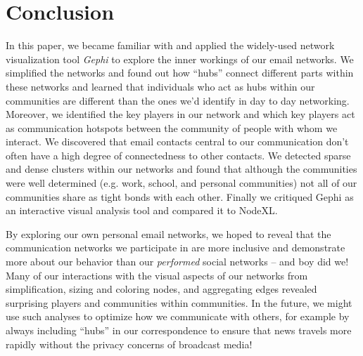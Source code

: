 \documentclass[11pt,letterpaper]{article}
\begin{document}
\section*{Conclusion}

In this paper, we became familiar with and applied the widely-used network visualization tool \textit{Gephi} to explore the inner workings of our email networks. We simplified the networks and found out how ``hubs'' connect different parts within these networks and learned that individuals who act as hubs within our communities are different than the ones we'd identify in day to day networking. Moreover, we identified the key players in our network and which key players act as communication hotspots between the community of people with whom we interact.  We discovered that email contacts central to our communication don't often have a high degree of connectedness to other contacts. We detected sparse and dense clusters within our networks and found that although the communities were well determined (e.g. work, school, and personal communities) not all of our communities share as tight bonds with each other. Finally we critiqued Gephi as an interactive visual analysis tool and compared it to NodeXL.

By exploring our own personal email networks, we hoped to reveal that the communication networks we participate in are more inclusive and demonstrate more about our behavior than our \textit{performed} social networks -- and boy did we! Many of our interactions with the visual aspects of our networks from simplification, sizing and coloring nodes, and aggregating edges revealed surprising players and communities within communities. In the future, we might use such analyses to optimize how we communicate with others, for example by always including ``hubs'' in our correspondence to ensure that news travels more rapidly without the privacy concerns of broadcast media!



\end{document}
